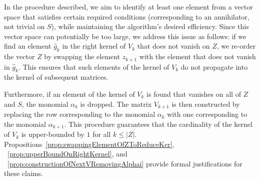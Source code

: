 \documentclass[11pt]{llncs}
\begin{document}


In the procedure described, we aim to identify at least one element from a vector space that satisfies certain required conditions (corresponding to an annihilator, not trivial on $S$), while maintaining the algorithm's desired efficiency. 
Since this vector space can potentially be too large, we address this issue as follows: if we find an element \( \hat{g}_k \) in the right kernel of \( V_k \) that does not vanish on \( Z \), we re-order the vector \( Z \) by swapping the element \( z_{k+1} \) with the element that does not vanish in \( \hat{g}_k \). 
This ensures that such elements of the kernel of \( V_k \) do not propagate into the kernel of subsequent matrices.

Furthermore, if an element of the kernel of \( V_k \) is found that vanishes on all of \( Z \) and \( S \), the monomial \( \alpha_k \) is dropped. 
The matrix \( V_{k+1} \) is then constructed by replacing the row corresponding to the monomial \( \alpha_k \) with one corresponding to the monomial \( \alpha_{k+1} \).
This procedure guarantees that the cardinality of the kernel of \( V_k \) is upper-bounded by \( 1 \) for all \( k \leq |Z| \).
Propositions~\ref{prop:swappingElementOfZToReduceKer}, ~\ref{prop:upperBoundOnRightKernel}, and ~\ref{prop:constructionOfNextVRemovingAlphai} provide formal justifications for these claims.
\end{document}

